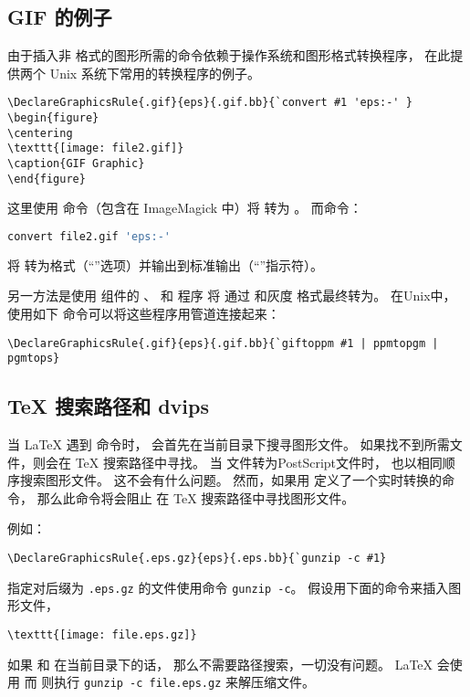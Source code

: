 \subsection{GIF 的例子}\label{ssec:gifexample}
由于插入非  格式的图形所需的命令依赖于操作系统和图形格式转换程序，
在此提供两个 Unix 系统下常用的转换程序的例子。

\begin{lstlisting}
\DeclareGraphicsRule{.gif}{eps}{.gif.bb}{`convert #1 'eps:-' }
\begin{figure}
\centering
\texttt{[image: file2.gif]}
\caption{GIF Graphic}
\end{figure}
\end{lstlisting}
这里使用 命令（包含在 ImageMagick 中）将 转为 。
而命令：
\begin{lstlisting}[language=bash]
convert file2.gif 'eps:-'
\end{lstlisting}
将  转为格式（“”选项）并输出到标准输出（“\opt{-}”指示符）。

另一方法是使用  组件的 、 和  程序
将  通过  和灰度  格式最终转为。
在Unix中，使用如下  命令可以将这些程序用管道连接起来：
\begin{lstlisting}[xleftmargin=0em]
\DeclareGraphicsRule{.gif}{eps}{.gif.bb}{`giftoppm #1 | ppmtopgm | pgmtops}
\end{lstlisting}


\subsection{\TeX{} 搜索路径和 dvips}\label{ssec:path-dvips}

当 \LaTeX{} 遇到 命令时，
会首先在当前目录下搜寻图形文件。
如果找不到所需文件，则会在 \TeX{} 搜索路径中寻找。
当  文件转为PostScript文件时， 也以相同顺序搜索图形文件。
这不会有什么问题。
然而，如果用  定义了一个实时转换的命令，
那么此命令将会阻止  在 \TeX{} 搜索路径中寻找图形文件。

例如：
\begin{lstlisting}
\DeclareGraphicsRule{.eps.gz}{eps}{.eps.bb}{`gunzip -c #1}
\end{lstlisting}
指定对后缀为 \texttt{.eps.gz} 的文件使用命令 \texttt{gunzip -c}。
假设用下面的命令来插入图形文件，
\begin{lstlisting}
\texttt{[image: file.eps.gz]}
\end{lstlisting}
如果  和  在当前目录下的话，
那么不需要路径搜索，一切没有问题。
\LaTeX{} 会使用  而  则执行 
\verb|gunzip -c file.eps.gz| 来解压缩文件。


